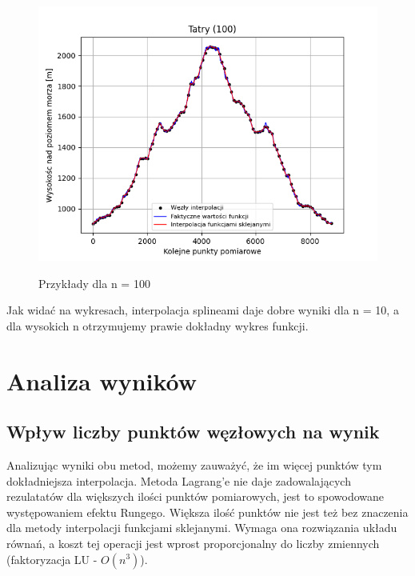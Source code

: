 \documentclass[fleqn]{article}
\begin{document}
\begin{figure}[h]
\begin{minipage}{.33\textwidth}
          \includegraphics[width=\linewidth]{plot_100_points_Tatry.png}
          \label{fig:sub3}
        \end{minipage}
        \caption{Przykłady dla n = 100}
        \label{fig:test}
    \end{figure}

    Jak widać na wykresach, interpolacja splineami daje dobre wyniki dla n = 10, a dla wysokich n otrzymujemy prawie dokładny wykres funkcji.
\newpage
\section{Analiza wyników}
\subsection{Wpływ liczby punktów węzłowych na wynik}
    Analizując wyniki obu metod, możemy zauważyć, że im więcej punktów tym dokładniejsza interpolacja. 
    Metoda Lagrang'e nie daje zadowalających rezulatatów dla większych ilości punktów pomiarowych,
    jest to spowodowane występowaniem efektu Rungego. Większa ilość punktów nie jest też bez znaczenia dla metody interpolacji
    funkcjami sklejanymi. Wymaga ona rozwiązania układu równań, a koszt tej operacji jest wprost proporcjonalny do liczby zmiennych (faktoryzacja LU - $O(n^3)$).
\end{document}
